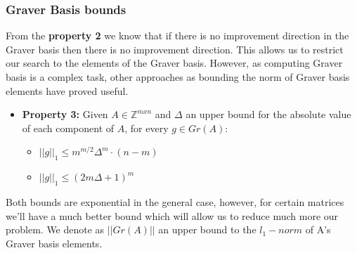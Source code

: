 \documentclass{beamer}
\begin{document}
    \begin{frame}
        \frametitle{Graver Basis bounds}
        From the \textbf{property 2} we know that if there is no improvement direction in the Graver basis then there is no improvement direction. This allows us to restrict our search to the elements of the Graver basis. However, as computing Graver basis is a complex task, other approaches as bounding the norm of Graver basis elements have proved useful.
        
        \vspace{0.5cm}
        \begin{itemize}
            \item \textbf{Property 3:} Given $A \in \mathbb{Z}^{mxn}$ and $\Delta$ an upper bound for the absolute value of each component of $A$, for every $g \in Gr(A)$:
            \begin{itemize}
                \item $||g||_1 \leq m^{m/2}\Delta^m\cdot(n - m)$
                \item $||g||_1 \leq (2m \Delta + 1)^m$
            \end{itemize}
        \end{itemize}
        
        \pause
        \vspace{0.5cm}
        Both bounds are exponential in the general case, however, for certain matrices we'll have a much better bound which will allow us to reduce much more our problem. We denote as $||Gr(A)||$ an upper bound to the $l_1-norm$ of A's Graver basis elements.
    \end{frame}
    
\end{document}
